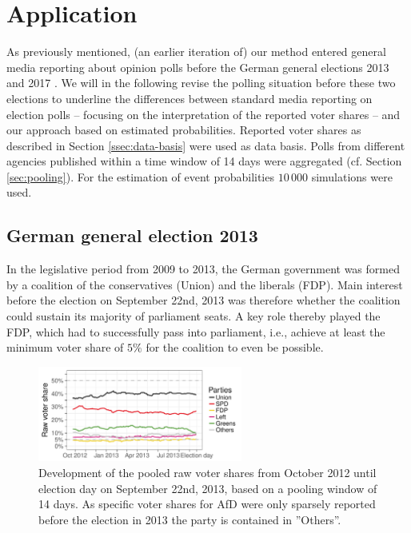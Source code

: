 \documentclass[smallcondensed]{svjour3}     %
\begin{document}
\section{Application} \label{sec:application}
As previously mentioned, (an earlier iteration of) our method entered
general media reporting about opinion polls before the German general elections
2013 and 2017 \citep[cf.][]{wahlistik_2013, gelitz_2017}.
We will in the following revise the polling situation before these two elections
to underline the differences between standard media reporting on election polls
-- focusing on the interpretation of the reported voter shares --
and our approach based on estimated probabilities. Reported voter shares as
described in Section \ref{ssec:data-basis} were used as data basis.
Polls from different agencies published within a time window of 14 days were
aggregated (cf. Section \ref{sec:pooling}). For the estimation of event
probabilities $10\,000$ simulations were used.


\subsection{German general election 2013} \label{subsec:2013}
In the legislative period from 2009 to 2013, the German government was formed by
a coalition of the conservatives (Union) and the liberals (FDP).
Main interest before the election on September 22nd, 2013 was therefore whether
the coalition could sustain its majority of parliament seats.
A key role thereby played the FDP, which had to successfully pass into parliament,
i.e., achieve at least the minimum voter share of $5\%$ for the coalition
to even be possible.

\begin{figure}[H]\centering
\includegraphics[width=0.6\textwidth]{figures/2013_pooled_rawShares.pdf}
\caption{Development of the pooled raw voter shares from October 2012 until election day on September 22nd, 2013, based on a pooling window of 14 days.
As specific voter shares for AfD were only sparsely reported before the election in 2013 the party is contained in ''Others''.
\label{fig:2013}
}
\end{figure}
\end{document}
